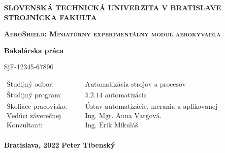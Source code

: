 \thispagestyle{empty}

\noindent \begin{center}
\textbf{{\large{}SLOVENSKÁ TECHNICKÁ UNIVERZITA V BRATISLAVE}}\\
\textbf{{\large{}STROJNÍCKA FAKULTA}}\textbf{\large{} }\\
\vspace{3cm}
\par\end{center}

\noindent \begin{center}
\vspace{3cm}
\par\end{center}



\begin{center}
\textbf{\textsc{\Large{}AeroShield: Miniatúrny experimentálny modul aerokyvadla}}\\
\par\end{center}{\Large \par}

\begin{center}
\textbf{\large{}Bakalárska práca}\\
\par\end{center}{\large \par}

\begin{center}
{\large{}SjF-12345-67890}\\
\end{center}


\vfill
\begin{flushleft}
$\begin{array}{ll}
\text{Študijný odbor:}&\text{Automatizácia strojov a procesov}\\
\text{Študijný program:}&\text{5.2.14 automatizácia}\\
\text{Školiace pracovisko:}&\text{Ústav automatizácie, merania a aplikovanej informatiky}\\
\text{Vedúci záverečnej práce:}&\text{Ing. Mgr. Anna Vargová.}\\
\text{Konzultant:}&\text{Ing. Erik Mikuláš}\\
\end{array}$
\end{flushleft}
\vspace{0.5cm}
\noindent \textbf{\large{}Bratislava, 2022} \hfill \textbf{\large{}Peter Tibenský}
\cleardoublepage
